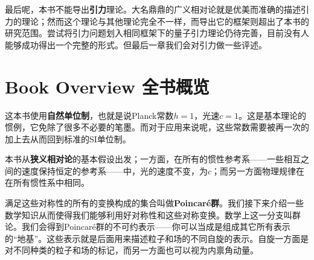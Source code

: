 最后呢，本书不能导出{\bfseries 引力}理论。大名鼎鼎的广义相对论就是优美而准确的描述引力的理论；然而这个理论与其他理论完全不一样，而导出它的框架则超出了本书的研究范围。尝试将引力问题划入相同框架下的量子引力理论仍待完善，目前没有人能够成功得出一个完整的形式。但最后一章我们会对引力做一些评述。

\section[全书概览]{Book Overview 全书概览}\label{sec1.2}

\begin{center}
\end{center}

这本书使用{\bfseries 自然单位制}，也就是说Planck常数$h = 1$，光速$c=1$。这是基本理论的惯例，它免除了很多不必要的笔墨。而对于应用来说呢，这些常数需要被再一次的加上去从而回到标准的SI单位制。

本书从{\bfseries 狭义相对论}的基本假设出发；一方面，在所有的惯性参考系——一些相互之间的速度保持恒定的参考系——中，光的速度不变，为$c$；而另一方面物理规律在在所有惯性系中相同。

满足这些对称性的所有的变换构成的集合叫做{\bfseries Poincaré群}。我们接下来介绍一些数学知识从而使得我们能够利用好对称性和这些对称变换。数学上这一分支叫群论。我们会得到Poincaré群的不可约表示——你可以当成是组成其它所有表示的“地基”。这些表示就是后面用来描述粒子和场的不同自旋的表示。自旋一方面是对不同种类的粒子和场的标记，而另一方面也可以视为内禀角动量。

